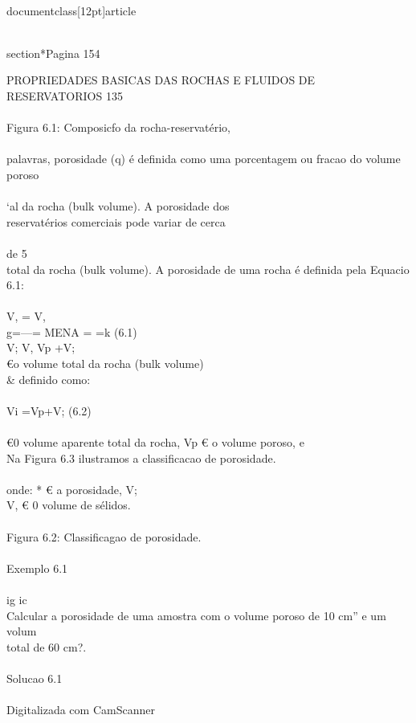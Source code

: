 \\documentclass[12pt]{article}
\begin{document}
\\section*{Pagina 154}

PROPRIEDADES BASICAS DAS ROCHAS E FLUIDOS DE RESERVATORIOS 135\\
\\
Figura 6.1: Composicfo da rocha-reservatério,\\
\\
palavras, porosidade (q) é definida como uma porcentagem ou fracao do volume poroso\\
\\
‘al da rocha (bulk volume). A porosidade dos\\
reservatérios comerciais pode variar de cerca\\
\\
de 5\\%
total da rocha (bulk volume). A porosidade de uma rocha é definida pela Equacio 6.1:\\
\\
V, = V,\\
g=—= MENA = =k (6.1)\\
V; V, Vp +V;\\
€o volume total da rocha (bulk volume) \\& definido como:\\
\\
Vi =Vp+V; (6.2)\\
\\
€0 volume aparente total da rocha, Vp € o volume poroso, e\\
Na Figura 6.3 ilustramos a classificacao de porosidade.\\
\\
onde: * € a porosidade, V;\\
V, € 0 volume de sélidos.\\
\\
Figura 6.2: Classificagao de porosidade.\\
\\
Exemplo 6.1\\
\\
ig ic\\
Calcular a porosidade de uma amostra com o volume poroso de 10 cm” e um volum\\
total de 60 cm?.\\
\\
Solucao 6.1\\
\\
Digitalizada com CamScanner\\
\end{document}
